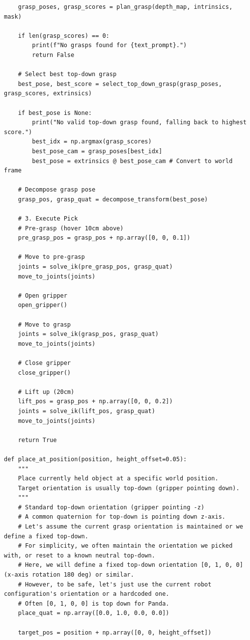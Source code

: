 \begin{lstlisting}
    grasp_poses, grasp_scores = plan_grasp(depth_map, intrinsics, mask)
    
    if len(grasp_scores) == 0:
        print(f"No grasps found for {text_prompt}.")
        return False
    
    # Select best top-down grasp
    best_pose, best_score = select_top_down_grasp(grasp_poses, grasp_scores, extrinsics)
    
    if best_pose is None:
        print("No valid top-down grasp found, falling back to highest score.")
        best_idx = np.argmax(grasp_scores)
        best_pose_cam = grasp_poses[best_idx]
        best_pose = extrinsics @ best_pose_cam # Convert to world frame

    # Decompose grasp pose
    grasp_pos, grasp_quat = decompose_transform(best_pose)

    # 3. Execute Pick
    # Pre-grasp (hover 10cm above)
    pre_grasp_pos = grasp_pos + np.array([0, 0, 0.1])
    
    # Move to pre-grasp
    joints = solve_ik(pre_grasp_pos, grasp_quat)
    move_to_joints(joints)
    
    # Open gripper
    open_gripper()
    
    # Move to grasp
    joints = solve_ik(grasp_pos, grasp_quat)
    move_to_joints(joints)
    
    # Close gripper
    close_gripper()
    
    # Lift up (20cm)
    lift_pos = grasp_pos + np.array([0, 0, 0.2])
    joints = solve_ik(lift_pos, grasp_quat)
    move_to_joints(joints)
    
    return True

def place_at_position(position, height_offset=0.05):
    """
    Place currently held object at a specific world position.
    Target orientation is usually top-down (gripper pointing down).
    """
    # Standard top-down orientation (gripper pointing -z)
    # A common quaternion for top-down is pointing down z-axis. 
    # Let's assume the current grasp orientation is maintained or we define a fixed top-down.
    # For simplicity, we often maintain the orientation we picked with, or reset to a known neutral top-down.
    # Here, we will define a fixed top-down orientation [0, 1, 0, 0] (x-axis rotation 180 deg) or similar.
    # However, to be safe, let's just use the current robot configuration's orientation or a hardcoded one.
    # Often [0, 1, 0, 0] is top down for Panda.
    place_quat = np.array([0.0, 1.0, 0.0, 0.0]) 

    target_pos = position + np.array([0, 0, height_offset])
    

\end{lstlisting}
